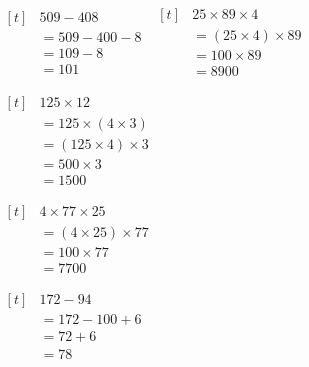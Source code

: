 \documentclass[UTF8]{ctexart}
\newcommand{\cell}[1]{%
  \begin{minipage}[t][49mm][t]{0.315\textwidth}%
    \vspace{0pt}%
    \linespread{1}\zihao{3}%
    #1%
  \end{minipage}%
}
\newcommand{\sheetrow}[3]{%
  \noindent\cell{#1}\hfill\cell{#2}\hfill\cell{#3}\par
  \nointerlineskip
}
\begin{document}
{\(\begin{aligned}[t]
& 509-408 \\
& = 509-400-8 \\
& = 109-8 \\
& = 101
\end{aligned}\)}
{\(\begin{aligned}[t]
& 25\times 89\times 4 \\
& = (25\times 4)\times 89 \\
& = 100\times 89 \\
& = 8900
\end{aligned}\)}
\sheetrow
{\(\begin{aligned}[t]
& 125\times 12 \\
& = 125\times (4\times 3) \\
& = (125\times 4)\times 3 \\
& = 500\times 3 \\
& = 1500
\end{aligned}\)}
{\(\begin{aligned}[t]
& 4\times 77\times 25 \\
& = (4\times 25)\times 77 \\
& = 100\times 77 \\
& = 7700
\end{aligned}\)}
{\(\begin{aligned}[t]
& 172-94 \\
& = 172-100+6 \\
& = 72+6 \\
& = 78
\end{aligned}\)}

\newpage
\end{document}
